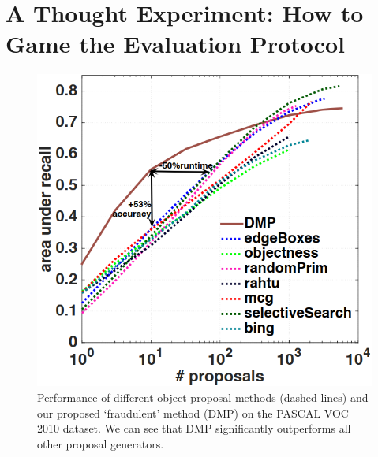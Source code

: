 \documentclass[10pt]{article}
\begin{document}
\section{A Thought Experiment: How to Game the Evaluation Protocol}%
\label{sec:experiment}
%
\begin{figure}[htpb]
  \centering
  \includegraphics[width=0.8\linewidth]{fig_3.png}
  \caption{Performance of different object proposal methods (dashed lines) and
    our proposed `fraudulent' method (DMP) on the PASCAL VOC 2010 dataset. We
    can see that DMP significantly outperforms all other proposal generators.}%
  \label{fig:3}
\end{figure}
\end{document}
